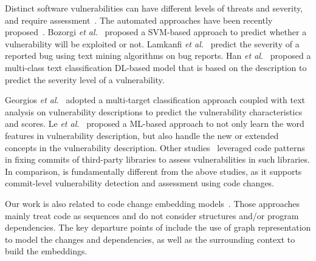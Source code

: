  Distinct software
vulnerabilities can have different levels of threats and severity, and
require
assessment~\cite{nayak2014some,le2019automated,khan2018review}.
The automated approaches have been recently
proposed~\cite{bozorgi2010beyond,allodi2014comparing,deepCVA-ase21}.
Bozorgi {\em et al.}~\cite{bozorgi2010beyond} proposed a SVM-based
approach to predict whether a vulnerability will be exploited or not.
Lamkanfi {\em et al.}~\cite{lamkanfi2010predicting} predict the
severity of a reported bug using text mining algorithms on bug reports.
%
Han {\em et al.}~\cite{han2017learning} proposed a multi-class text
classification DL-based model that is based on the
description to predict the severity level of a vulnerability.

Georgios {\em et al.}~\cite{spanos2018multi} adopted a multi-target
classification approach coupled with text analysis on vulnerability
descriptions to predict the vulnerability characteristics and scores.
Le {\em et al.}~\cite{le2019automated} proposed a ML-based approach to
not only learn the word features in vulnerability description, but
also handle the new or extended concepts in the vulnerability
description.
Other studies~\cite{ponta2018beyond,ponta2020detection} leveraged code
patterns in fixing commits of third-party libraries to assess
vulnerabilities in such libraries. In comparison, {\tool} is
fundamentally different from the above studies, as it supports
commit-level vulnerability detection and assessment using code
changes.


 Our work is also related to
code change embedding models~\cite{cc2vec,commit2vec}. Those
approaches mainly treat code as sequences and do not consider
structures and/or program dependencies. The key departure points of
{\tool} include the use of graph representation to model the changes
and dependencies, as well as the surrounding context to build the
embeddings.
